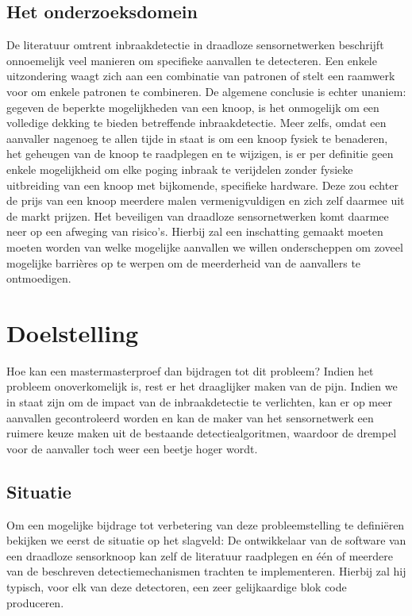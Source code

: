 \documentclass[12pt,a4paper]{article}
\begin{document}
\subsection*{Het onderzoeksdomein}

De literatuur omtrent inbraakdetectie in draadloze sensornetwerken beschrijft
onnoemelijk veel manieren om specifieke aanvallen te detecteren. Een enkele
uitzondering waagt zich aan een combinatie van patronen of stelt een raamwerk
voor om enkele patronen te combineren. De algemene conclusie is echter unaniem:
gegeven de beperkte mogelijkheden van een knoop, is het onmogelijk om een
volledige dekking te bieden betreffende inbraakdetectie. Meer zelfs, omdat een
aanvaller nagenoeg te allen tijde in staat is om een knoop fysiek te benaderen,
het geheugen van de knoop te raadplegen en te wijzigen, is er per definitie
geen enkele mogelijkheid om elke poging inbraak te verijdelen zonder fysieke
uitbreiding van een knoop met bijkomende, specifieke hardware. Deze zou echter
de prijs van een knoop meerdere malen vermenigvuldigen en zich zelf daarmee uit
de markt prijzen. Het beveiligen van draadloze sensornetwerken komt daarmee
neer op een afweging van risico's. Hierbij zal een inschatting gemaakt moeten
moeten worden van welke mogelijke aanvallen we willen onderscheppen om zoveel
mogelijke barri\`eres op te werpen om de meerderheid van de aanvallers te
ontmoedigen.

\section*{Doelstelling}

Hoe kan een mastermasterproef dan bijdragen tot dit probleem? Indien het probleem
onoverkomelijk is, rest er het draaglijker maken van de pijn. Indien we in
staat zijn om de impact van de inbraakdetectie te verlichten, kan er op meer
aanvallen gecontroleerd worden en kan de maker van het sensornetwerk een
ruimere keuze maken uit de bestaande detectiealgoritmen, waardoor de drempel
voor de aanvaller toch weer een beetje hoger wordt.

\subsection*{Situatie}

Om een mogelijke bijdrage tot verbetering van deze probleemstelling te
defini\"eren bekijken we eerst de situatie op het slagveld: De ontwikkelaar van
de software van een draadloze sensorknoop kan zelf de literatuur raadplegen en
\'e\'en of meerdere van de beschreven detectiemechanismen trachten te
implementeren. Hierbij zal hij typisch, voor elk van deze detectoren, een zeer
gelijkaardige blok code produceren.
\end{document}
